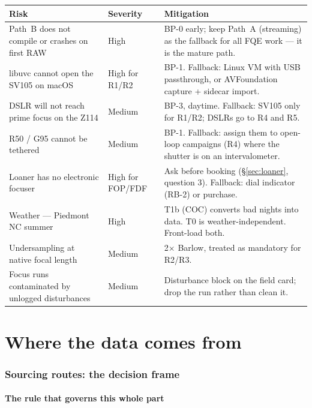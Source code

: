 \documentclass[11pt]{article}
\begin{document}
\begin{center}
\scriptsize
\begin{tabular}{@{}p{}p{}p{}@{}}
\toprule
\textbf{Risk} & \textbf{Severity} & \textbf{Mitigation} \\
\midrule
Path~B does not compile or crashes on first RAW & High & BP-0 early; keep Path~A (streaming) as the fallback for all FQE work --- it is the mature path. \\
libuvc cannot open the SV105 on macOS & High for R1/R2 & BP-1. Fallback: Linux VM with USB passthrough, or AVFoundation capture + sidecar import. \\
DSLR will not reach prime focus on the Z114 & Medium & BP-3, daytime. Fallback: SV105 only for R1/R2; DSLRs go to R4 and R5. \\
R50 / G95 cannot be tethered & Medium & BP-1. Fallback: assign them to open-loop campaigns (R4) where the shutter is on an intervalometer. \\
Loaner has no electronic focuser & High for FOP/FDF & Ask before booking (\S\ref{sec:loaner}, question 3). Fallback: dial indicator (RB-2) or purchase. \\
Weather --- Piedmont NC summer & High & T1b (COC) converts bad nights into data. T0 is weather-independent. Front-load both. \\
Undersampling at native focal length & Medium & 2$\times$ Barlow, treated as mandatory for R2/R3. \\
Focus runs contaminated by unlogged disturbances & Medium & Disturbance block on the field card; drop the run rather than clean it. \\
\bottomrule
\end{tabular}
\end{center}

\part{Where the data comes from}

\section{Sourcing routes: the decision frame}

\subsection{The rule that governs this whole part}
\end{document}
